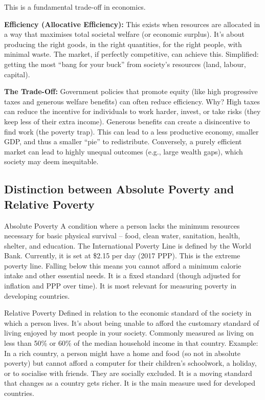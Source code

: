 \documentclass[11pt, a4paper, twoside]{book}
\begin{document}
This is a fundamental trade-off in economics.

\textbf{Efficiency (Allocative Efficiency):} This exists when resources are allocated in a way that maximises total societal welfare (or economic surplus). It's about producing the right goods, in the right quantities, for the right people, with minimal waste. The market, if perfectly competitive, can achieve this. Simplified: getting the most ``bang for your buck'' from society's resources (land, labour, capital).

\textbf{The Trade-Off:} Government policies that promote equity (like high progressive taxes and generous welfare benefits) can often reduce efficiency. Why? High taxes can reduce the incentive for individuals to work harder, invest, or take risks (they keep less of their extra income). Generous benefits can create a disincentive to find work (the poverty trap). This can lead to a less productive economy, smaller GDP, and thus a smaller ``pie'' to redistribute. Conversely, a purely efficient market can lead to highly unequal outcomes (e.g., large wealth gaps), which society may deem inequitable.

\subsection{Distinction between Absolute Poverty and Relative Poverty}

\begin{keyterm}{Absolute Poverty}
A condition where a person lacks the minimum resources necessary for basic physical survival -- food, clean water, sanitation, health, shelter, and education. The International Poverty Line is defined by the World Bank. Currently, it is set at \$2.15 per day (2017 PPP). This is the extreme poverty line. Falling below this means you cannot afford a minimum calorie intake and other essential needs. It is a fixed standard (though adjusted for inflation and PPP over time). It is most relevant for measuring poverty in developing countries.
\end{keyterm}

\begin{keyterm}{Relative Poverty}
Defined in relation to the economic standard of the society in which a person lives. It's about being unable to afford the customary standard of living enjoyed by most people in your society. Commonly measured as living on less than 50\% or 60\% of the median household income in that country. Example: In a rich country, a person might have a home and food (so not in absolute poverty) but cannot afford a computer for their children's schoolwork, a holiday, or to socialise with friends. They are socially excluded. It is a moving standard that changes as a country gets richer. It is the main measure used for developed countries.
\end{keyterm}
\end{document}

